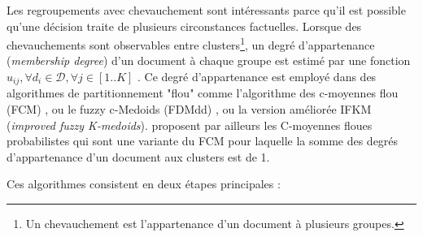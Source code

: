 Les regroupements avec chevauchement sont intéressants parce qu'il est possible qu'une décision traite de plusieurs circonstances factuelles. Lorsque des chevauchements sont observables entre clusters\footnote{Un chevauchement est l'appartenance d'un document à plusieurs groupes.}, un degré d'appartenance (\textit{membership degree}) d'un document à chaque groupe est estimé par une fonction $u_{ij}, \forall d_i \in \mathcal{D}, \forall j \in [1..K]$  \citep{baraldi1999surveyfuzzyclstering}. Ce degré d'appartenance est employé dans des algorithmes de partitionnement "flou" comme l'algorithme des c-moyennes flou (FCM) \citep{bezdek1984fcm, hathaway1989fuzzycmeans}, ou le fuzzy c-Medoids (FDMdd) \citep{krishnapuram2001fuzzycmedoids}, ou la version améliorée IFKM (\textit{improved fuzzy K-medoids})\citep{sabzi2011fuzzykmedoids}. \citet{nefti2004probabilisticFuzzyCMeans} proposent par ailleurs les C-moyennes floues probabilistes qui sont une variante du FCM pour laquelle la somme des degrés d'appartenance  d'un document aux clusters est de 1. 

 Ces algorithmes consistent en deux étapes principales \citep{sabzi2011fuzzykmedoids}: 

